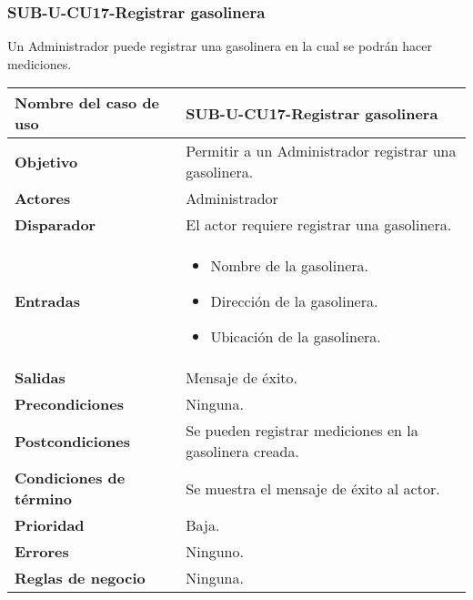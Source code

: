 \subsubsection{SUB-U-CU17-Registrar gasolinera}\label{SUB-U-CU17}
Un Administrador puede registrar una gasolinera en la cual se podrán hacer mediciones.

\begin{longtable}{|J{5cm}|J{10.3cm}|}
	\hline
	\textbf{Nombre del caso de uso} &
		SUB-U-CU17-Registrar gasolinera \\ \hline
	\textbf{Objetivo} &
		Permitir a un Administrador registrar una gasolinera. \\ \hline
	\textbf{Actores} &
		Administrador \\ \hline 
	\textbf{Disparador} & 
		El actor requiere registrar una gasolinera. \\ \hline 
	\textbf{Entradas} & 
		\begin{itemize}
				\item Nombre de la gasolinera.
				\item Dirección de la gasolinera.
				\item Ubicación de la gasolinera.
		\end{itemize}\\ \hline 
	\textbf{Salidas} & Mensaje de éxito.
		\\ \hline
	\textbf{Precondiciones} & Ninguna.
		\\ \hline
	\textbf{Postcondiciones} & Se pueden registrar mediciones en la gasolinera creada.
		\\ \hline
	\textbf{Condiciones de término} & Se muestra el mensaje de éxito al actor.
		\\ \hline 
	\textbf{Prioridad} & 
		Baja. \\ \hline
	\textbf{Errores} & Ninguno.
		\\ \hline
	\textbf{Reglas de negocio} & Ninguna.
		 \\ \hline
\end{longtable}

